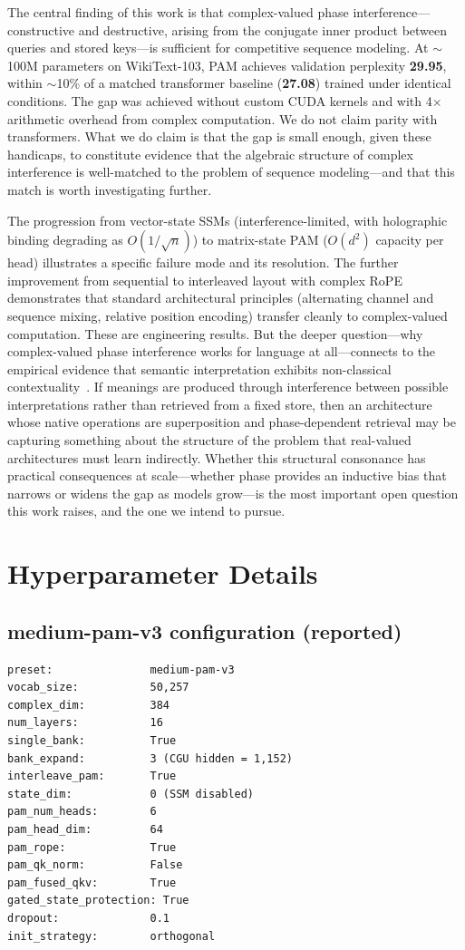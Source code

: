 \documentclass[11pt]{article}
\begin{document}
The central finding of this work is that complex-valued phase interference---constructive and destructive, arising from the conjugate inner product between queries and stored keys---is sufficient for competitive sequence modeling. At $\sim$100M parameters on WikiText-103, PAM achieves validation perplexity \textbf{29.95}, within $\sim$10\% of a matched transformer baseline (\textbf{27.08}) trained under identical conditions. The gap was achieved without custom CUDA kernels and with 4$\times$ arithmetic overhead from complex computation. We do not claim parity with transformers. What we do claim is that the gap is small enough, given these handicaps, to constitute evidence that the algebraic structure of complex interference is well-matched to the problem of sequence modeling---and that this match is worth investigating further.

The progression from vector-state SSMs (interference-limited, with holographic binding degrading as $O(1/\sqrt{n})$) to matrix-state PAM ($O(d^2)$ capacity per head) illustrates a specific failure mode and its resolution. The further improvement from sequential to interleaved layout with complex RoPE demonstrates that standard architectural principles (alternating channel and sequence mixing, relative position encoding) transfer cleanly to complex-valued computation. These are engineering results. But the deeper question---why complex-valued phase interference works for language at all---connects to the empirical evidence that semantic interpretation exhibits non-classical contextuality~\cite{agostino2025quantum,agostino2026production,busemeyer2012quantum}. If meanings are produced through interference between possible interpretations rather than retrieved from a fixed store, then an architecture whose native operations are superposition and phase-dependent retrieval may be capturing something about the structure of the problem that real-valued architectures must learn indirectly. Whether this structural consonance has practical consequences at scale---whether phase provides an inductive bias that narrows or widens the gap as models grow---is the most important open question this work raises, and the one we intend to pursue.

\appendix

\section{Hyperparameter Details}
\subsection{medium-pam-v3 configuration (reported)}
\begin{verbatim}
preset:               medium-pam-v3
vocab_size:           50,257
complex_dim:          384
num_layers:           16
single_bank:          True
bank_expand:          3 (CGU hidden = 1,152)
interleave_pam:       True
state_dim:            0 (SSM disabled)
pam_num_heads:        6
pam_head_dim:         64
pam_rope:             True
pam_qk_norm:          False
pam_fused_qkv:        True
gated_state_protection: True
dropout:              0.1
init_strategy:        orthogonal
\end{verbatim}
\end{document}
